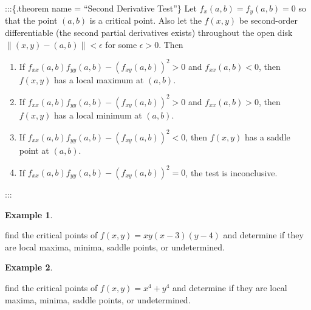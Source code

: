 \documentclass[
]{book}
\theoremstyle{definition}
\theoremstyle{definition}
\newtheorem{example}{Example}[chapter]
\theoremstyle{definition}
\theoremstyle{remark}
\begin{document}
:::\{.theorem name = ``Second Derivative Test''\}
Let \(f_x(a, b) = f_y(a, b) = 0\) so that the point \((a, b)\) is a critical point. Also let the \(f(x, y)\) be second-order differentiable (the second partial derivatives exists) throughout the open disk \(\| (x, y) - (a, b)\|< \epsilon\) for some \(\epsilon > 0\). Then

\begin{enumerate}
\def\labelenumi{\arabic{enumi})}
\item
  If \(f_{xx}(a, b)f_{yy}(a, b) - (f_{xy}(a, b))^2 > 0\) and \(f_{xx}(a, b) < 0\), then \(f(x, y)\) has a local maximum at \((a, b)\).
\item
  If \(f_{xx}(a, b)f_{yy}(a, b) - (f_{xy}(a, b))^2 > 0\) and \(f_{xx}(a, b) > 0\), then \(f(x, y)\) has a local minimum at \((a, b)\).
\item
  If \(f_{xx}(a, b)f_{yy}(a, b) - (f_{xy}(a, b))^2 < 0\), then \(f(x, y)\) has a saddle point at \((a, b)\).
\item
  If \(f_{xx}(a, b)f_{yy}(a, b) - (f_{xy}(a, b))^2 = 0\), the test is inconclusive.
\end{enumerate}

:::

\begin{example}
\protect\hypertarget{exm:unlabeled-div-225}{}\label{exm:unlabeled-div-225}

find the critical points of \(f(x, y) = xy(x - 3)(y - 4)\) and determine if they are local maxima, minima, saddle points, or undetermined.

\end{example}

\begin{example}
\protect\hypertarget{exm:unlabeled-div-226}{}\label{exm:unlabeled-div-226}

find the critical points of \(f(x, y) = x^4 + y^4\) and determine if they are local maxima, minima, saddle points, or undetermined.

\end{example}
\end{document}
